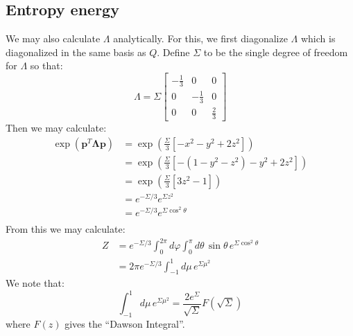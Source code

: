\documentclass[reqno]{article}
\begin{document}
\subsection{Entropy energy}

We may also calculate $\Lambda$ analytically.
For this, we first diagonalize $\Lambda$ which is diagonalized in the same basis as $Q$.
Define $\Sigma$ to be the single degree of freedom for $\Lambda$ so that:
\begin{equation}
    \Lambda
    =
    \Sigma \begin{bmatrix}
        -\frac13 &0 &0 \\
        0 &-\frac13 &0 \\
        0 &0 &\frac23
    \end{bmatrix}
\end{equation}
Then we may calculate:
\begin{equation}
\begin{split}
    \exp(\mathbf p^T \boldsymbol \Lambda \mathbf p)
    &=
    \exp\left(\frac{\Sigma}{3} \left[-x^2 - y^2 + 2z^2 \right] \right) \\
    &=
    \exp\left(\frac{\Sigma}{3} \left[-\left(1 - y^2 - z^2\right) - y^2 + 2z^2 \right] \right) \\
    &=
    \exp \left( \frac{\Sigma}{3} \left[ 3 z^2 - 1 \right] \right) \\
    &= 
    e^{-\Sigma / 3} e^{\Sigma z^2} \\
    &=
    e^{-\Sigma / 3} e^{\Sigma \cos^2 \theta} \\
\end{split}
\end{equation}
From this we may calculate:
\begin{equation}
\begin{split}
    Z
    &=
    e^{-\Sigma / 3} \int_0^{2\pi} d\varphi \int_0^\pi d\theta \, \sin\theta \, e^{\Sigma \cos^2\theta} \\
    &=
    2 \pi e^{-\Sigma / 3} \int_{-1}^1 d\mu \, e^{\Sigma \mu^2}
\end{split}
\end{equation}
We note that:
\begin{equation}
    \int_{-1}^1 d\mu \, e^{\Sigma \mu^2}
    =
    \frac{2 e^\Sigma}{\sqrt{\Sigma}} F\left(\sqrt{\Sigma}\right)
\end{equation}
where $F(z)$ gives the ``Dawson Integral''.
\end{document}

